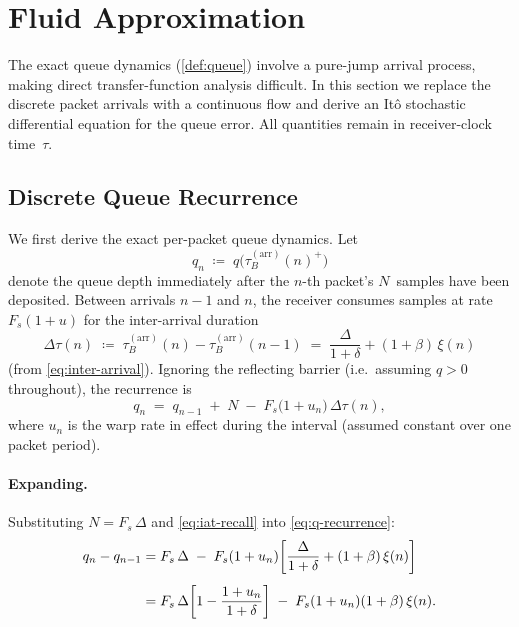 \documentclass[11pt, a4paper]{article}
\theoremstyle{definition}
\theoremstyle{plain}
\theoremstyle{remark}
\begin{document}
\section{Fluid Approximation}\label{sec:fluid}

The exact queue dynamics (\cref{def:queue}) involve a pure-jump
arrival process, making direct transfer-function analysis difficult.
In this section we replace the discrete packet arrivals with a
continuous flow and derive an It\^{o} stochastic differential equation
for the queue error.  All quantities remain in receiver-clock
time~$\tau$.

\subsection{Discrete Queue Recurrence}\label{sec:discrete-recurrence}

We first derive the exact per-packet queue dynamics.  Let
\begin{equation}\label{eq:q-sampled}
  q_n \;\coloneqq\; q\!\bigl(\tau_B^{(\text{arr})}(n)^{+}\bigr)
\end{equation}
denote the queue depth immediately after the $n$-th packet's $N$~samples
have been deposited.  Between arrivals $n{-}1$ and $n$, the receiver
consumes samples at rate $F_s(1+u)$ for the inter-arrival
duration
\begin{equation}\label{eq:iat-recall}
  \Delta\tau(n)
    \;\coloneqq\; \tau_B^{(\text{arr})}(n) - \tau_B^{(\text{arr})}(n-1)
    \;=\; \frac{\Delta}{1+\delta} + (1+\beta)\,\xi(n)
\end{equation}
(from \eqref{eq:inter-arrival}).
Ignoring the reflecting barrier (i.e.\ assuming $q > 0$ throughout),
the recurrence is
\begin{equation}\label{eq:q-recurrence}
  q_n \;=\; q_{n-1} \;+\; N
        \;-\; F_s\bigl(1 + u_n\bigr)\,\Delta\tau(n),
\end{equation}
where $u_n$ is the warp rate in effect during the interval
(assumed constant over one packet period).

\paragraph{Expanding.}
Substituting $N = F_s\,\Delta$ and
\eqref{eq:iat-recall} into \eqref{eq:q-recurrence}:
\begin{align}
  q_n - q_{n-1}
    &= F_s\,\Delta
       \;-\; F_s(1+u_n)\!\left[
         \frac{\Delta}{1+\delta} + (1+\beta)\,\xi(n)\right]
       \notag \\[4pt]
    &= F_s\,\Delta\!\left[1 - \frac{1+u_n}{1+\delta}\right]
       \;-\; F_s(1+u_n)(1+\beta)\,\xi(n).
       \label{eq:dq-exact}
\end{align}
\end{document}
